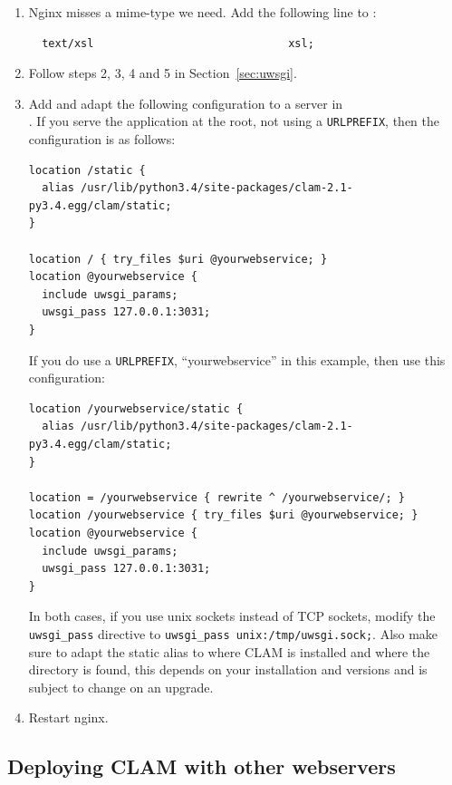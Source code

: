 \documentclass[a4paper,12pt,twoside,openright]{report}
\begin{document}
\begin{enumerate}[leftmargin=5mm]
\item Nginx misses a mime-type we need. Add the following
    line to :
{ \small
\begin{verbatim}
  text/xsl                              xsl;
\end{verbatim}
}

\item Follow steps 2, 3, 4 and 5 in Section~\ref{sec:uwsgi}.

\item Add and adapt the following configuration to a server in \\
    . If you serve the application at the
        root, not using a \texttt{URLPREFIX}, then the configuration is as
        follows:
{\small
\begin{verbatim}
location /static {
  alias /usr/lib/python3.4/site-packages/clam-2.1-py3.4.egg/clam/static;
}

location / { try_files $uri @yourwebservice; }
location @yourwebservice {
  include uwsgi_params;
  uwsgi_pass 127.0.0.1:3031;
}
\end{verbatim}
}
If you do use a \texttt{URLPREFIX}, ``yourwebservice'' in this example, then
use this configuration:
{\small
\begin{verbatim}
location /yourwebservice/static {
  alias /usr/lib/python3.4/site-packages/clam-2.1-py3.4.egg/clam/static;
}

location = /yourwebservice { rewrite ^ /yourwebservice/; }
location /yourwebservice { try_files $uri @yourwebservice; }
location @yourwebservice {
  include uwsgi_params;
  uwsgi_pass 127.0.0.1:3031;
}
\end{verbatim}
}
In both cases, if you use unix sockets instead of TCP sockets, modify the \texttt{uwsgi\_pass} directive
to \texttt{uwsgi\_pass unix:/tmp/uwsgi.sock;}. Also make sure to adapt the static alias to where CLAM is
installed and where the  directory is found, this depends on your
installation and versions and is subject to change on an upgrade.
\item Restart nginx.
\end{enumerate}

\subsection{Deploying CLAM with other webservers}
\end{document}
